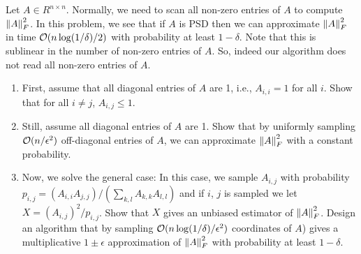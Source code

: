 \documentclass[10pt]{article}
\begin{document}
\begin{problem}[Problem 3]
    Let \( A \in R^{n\times n} \). Normally, we need to scan all non-zero entries of \( A \) to compute \( \left\lVert A\right\rVert_F^2 \). In this problem,
    we see that if \( A \) is PSD then we can approximate \( \left\lVert A\right\rVert_F^2 \) in time \( \mathcal{O}(n \log(1/\delta)/2) \) with probability at least \( 1 - \delta \). Note that this is sublinear in the number of non-zero entries of \( A \). So, indeed our algorithm does not read all non-zero entries of \( A \).

\begin{enumerate}[label=(\alph*),nolistsep]
    \item First, assume that all diagonal entries of \( A \) are 1, i.e., \( A_{i,i} = 1 \) for all \( i \). Show that for all \( i \neq j\), \( A_{i,j} \leq 1 \).

    \item Still, assume all diagonal entries of \( A \) are 1. Show that by uniformly sampling \( \mathcal{O}(n/\epsilon^2) \) off-diagonal entries of \( A \), we can approximate \( \left\lVert A\right\rVert_F^2 \) with a constant probability.

    \item Now, we solve the general case: In this case, we sample \( A_{i,j} \) with probability \( p_{i,j} = (A_{i,i}A_{j,j})/(\sum_{k,l} A_{k,k}A_{l,l}) \) and if \( i \), \( j \) is sampled we let \( X = (A_{i,j})^2/p_{i,j} \). Show that \( X \) gives an unbiased estimator of \( \left\lVert A\right\rVert_F^2 \). Design an algorithm that by sampling \( \mathcal{O}(n \log(1/\delta)/\epsilon^2 ) \) coordinates of \( A \)) gives a multiplicative \( 1 \pm \epsilon \)  approximation of \( \left\lVert A\right\rVert_F^2 \) with probability at least \( 1 - \delta\).
\end{enumerate}
\end{problem}
\end{document}
